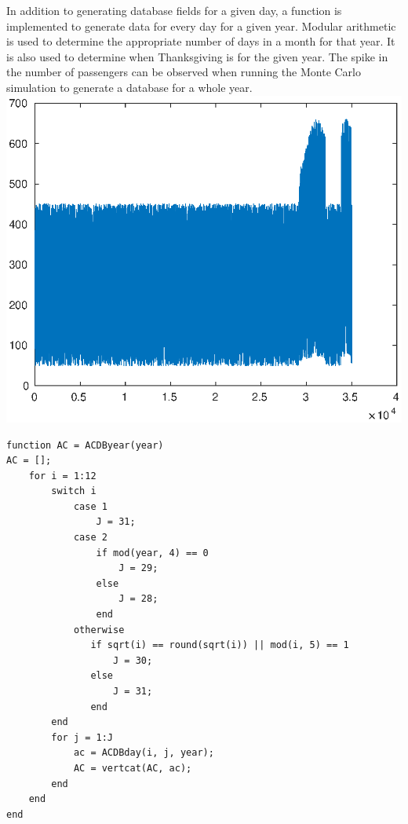 \documentclass[12pt]{article}
\begin{document}
In addition to generating database fields for a given day, a function is implemented to generate data for every day for a given year. Modular arithmetic is used to determine the appropriate number of days in a month for that year. It is also used to determine when Thanksgiving is for the given year. The spike in the number of passengers can be observed when running the Monte Carlo simulation to generate a database for a whole year. \\
\includegraphics{yeardist.eps}

\sloppy
{}
\setlength{\parindent}{0pt}
\begin{verbatim}
function AC = ACDByear(year)
AC = [];
	for i = 1:12
        switch i
            case 1
                J = 31;
            case 2
                if mod(year, 4) == 0
                    J = 29;
                else
                    J = 28;
                end
            otherwise
               if sqrt(i) == round(sqrt(i)) || mod(i, 5) == 1
                   J = 30;
               else
                   J = 31;
               end
        end
        for j = 1:J
            ac = ACDBday(i, j, year);
            AC = vertcat(AC, ac);
        end
    end
end
\end{verbatim}
\end{document}
